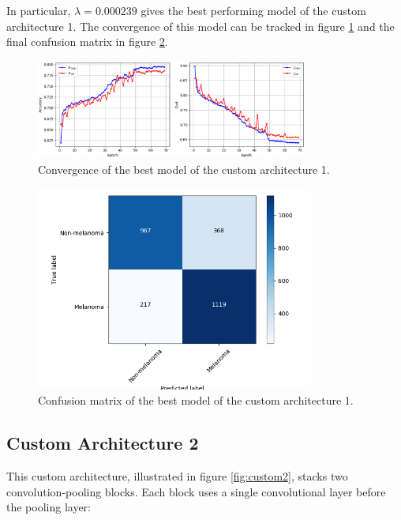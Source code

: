 In particular, $\lambda = 0.000239$ gives the best performing model of the custom architecture 1. The convergence of this model can be tracked in figure \ref{fig:custom1_best_training} and the final confusion matrix in figure \ref{fig:custom1_best_confusionmatrix}.

\begin{figure}[ht]
    \centering
    \includegraphics[width=0.8\textwidth]{figs/custom1_best_training.png}
    \caption{Convergence of the best model of the custom architecture 1.}
    \label{fig:custom1_best_training}
\end{figure}

\begin{figure}[ht]
    \centering
    \includegraphics[width=0.8\textwidth]{figs/custom1_best_confusionmatrix.png}
    \caption{Confusion matrix of the best model of the custom architecture 1.}
    \label{fig:custom1_best_confusionmatrix}
\end{figure}

\subsection{Custom Architecture 2}

This custom architecture, illustrated in figure \ref{fig:custom2}, stacks two convolution-pooling blocks. Each block uses a single convolutional layer before the pooling layer:

